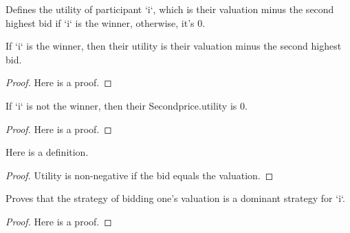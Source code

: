 \begin{definition}\label{Secondprice.utility}
    \leanok
    Defines the utility of participant `i`, which is their valuation minus the second highest bid if `i` is the winner, otherwise, it's 0.
\end{definition}

\begin{lemma}\label{Secondprice.utility_winner}
    \leanok
    If `i` is the winner, then their utility is their valuation minus the second highest bid.
\end{lemma}
\begin{proof}
    Here is a proof.
\end{proof}

\begin{lemma}\label{Secondprice.utility_loser}
    \leanok
    If `i` is not the winner, then their Secondprice.utility is 0.
\end{lemma}
\begin{proof}
    Here is a proof.
\end{proof}


\begin{lemma}\label{Secondprice.utility_nneg}
    \leanok
    Here is a definition.
\end{lemma}
\begin{proof}
    Utility is non-negative if the bid equals the valuation.
\end{proof}

\begin{lemma}\label{Secondprice.valuation_is_dominant}
    \leanok
          Proves that the strategy of bidding one's valuation is a dominant strategy for `i`.
\end{lemma}
\begin{proof}
    Here is a proof.
\end{proof}







